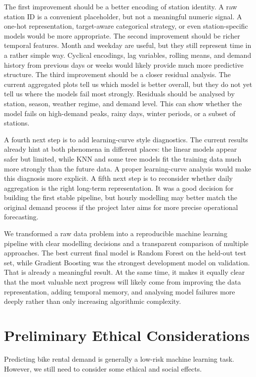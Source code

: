 \documentclass[conference]{IEEEtran}
\begin{document}
The first improvement should be a better encoding of station identity. A raw station ID is a convenient
placeholder, but not a meaningful numeric signal. A one-hot representation, target-aware categorical
strategy, or even station-specific models would be more appropriate. The second improvement should
be richer temporal features. Month and weekday are useful, but they still represent time in a rather
simple way. Cyclical encodings, lag variables, rolling means, and demand history from previous days
or weeks would likely provide much more predictive structure. The third improvement should be a
closer residual analysis. The current aggregated plots tell us which model is better overall, 
but they do not yet tell us where the models fail most strongly. Residuals should be analysed 
by station, season, weather regime, and demand level. This can show whether the model fails on 
high-demand peaks, rainy days, winter periods, or a subset of stations.

A fourth next step is to add learning-curve style diagnostics. The current results already hint at 
both phenomena in different places: the linear models appear safer but limited, while KNN and some 
tree models fit the training data much more strongly than the future data. A proper learning-curve 
analysis would make this diagnosis more explicit. A fifth next step is to reconsider whether daily 
aggregation is the right long-term representation. It was a good decision for building the first 
stable pipeline, but hourly modelling may better match the original demand process if the project 
later aims for more precise operational forecasting.

We transformed a raw data problem into a reproducible machine learning pipeline with clear modelling 
decisions and a transparent comparison of multiple approaches. The best current final model is 
Random Forest on the held-out test set, while Gradient Boosting was the strongest development 
model on validation. That is already a meaningful result. At the same time, it
makes it equally clear that the most valuable next progress will likely come from improving the 
data representation, adding temporal memory, and analysing model failures more deeply rather 
than only increasing algorithmic complexity.

\section{Preliminary Ethical Considerations}

Predicting bike rental demand is generally a low-risk machine learning task. However, we still need to consider some ethical and social effects. 
\end{document}
